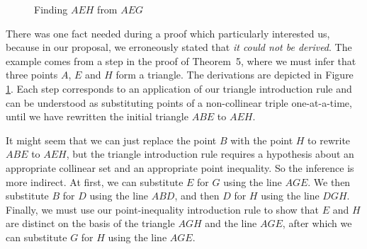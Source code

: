 \begin{figure}
\caption{Finding $AEH$ from $AEG$}
\label{fig:deriveAEH}
\end{figure}

There was one fact needed during a proof which particularly interested us, because in our proposal, we erroneously stated that \emph{it could not be derived}. The example comes from a step in the proof of Theorem~5, where we must infer that three points $A$, $E$ and $H$ form a triangle. The derivations are depicted in Figure \ref{fig:deriveAEH}. Each step corresponds to an application of our triangle introduction rule and can be understood as substituting points of a non-collinear triple one-at-a-time, until we have rewritten the initial triangle $ABE$ to $AEH$.

It might seem that we can just replace the point $B$ with the point $H$ to rewrite $ABE$ to $AEH$, but the triangle introduction rule requires a hypothesis about an appropriate collinear set and an appropriate point inequality. So the inference is more indirect. At first, we can substitute $E$ for $G$ using the line $AGE$. We then substitute $B$ for $D$ using the line $ABD$, and then $D$ for $H$ using the line $DGH$. Finally, we must use our point-inequality introduction rule to show that $E$ and $H$ are distinct on the basis of the triangle $AGH$ and the line $AGE$, after which we can substitute $G$ for $H$ using the line $AGE$.

